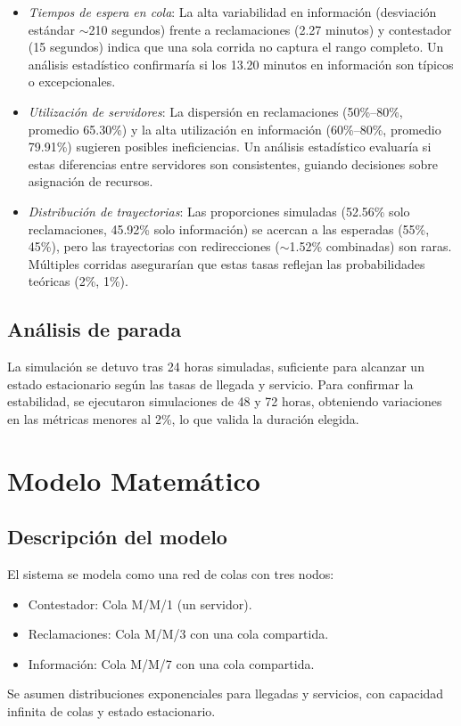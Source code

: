 \documentclass[12pt]{article}
\begin{document}
\begin{itemize}
\begin{itemize}
        \item \textit{Tiempos de espera en cola}: La alta variabilidad en información (desviación estándar $\sim$210 segundos) frente a reclamaciones (2.27 minutos) y contestador (15 segundos) indica que una sola corrida no captura el rango completo. Un análisis estadístico confirmaría si los 13.20 minutos en información son típicos o excepcionales.
        
        \item \textit{Utilización de servidores}: La dispersión en reclamaciones (50\%--80\%, promedio 65.30\%) y la alta utilización en información (60\%--80\%, promedio 79.91\%) sugieren posibles ineficiencias. Un análisis estadístico evaluaría si estas diferencias entre servidores son consistentes, guiando decisiones sobre asignación de recursos.
        
        \item \textit{Distribución de trayectorias}: Las proporciones simuladas (52.56\% solo reclamaciones, 45.92\% solo información) se acercan a las esperadas (55\%, 45\%), pero las trayectorias con redirecciones ($\sim$1.52\% combinadas) son raras. Múltiples corridas asegurarían que estas tasas reflejan las probabilidades teóricas (2\%, 1\%).
    \end{itemize}
\end{itemize}

\subsection{Análisis de parada}
La simulación se detuvo tras 24 horas simuladas, suficiente para alcanzar un estado estacionario según las tasas de llegada y servicio. Para confirmar la estabilidad, se ejecutaron simulaciones de 48 y 72 horas, obteniendo variaciones en las métricas menores al 2\%, lo que valida la duración elegida.

\section{Modelo Matemático}

\subsection{Descripción del modelo}
El sistema se modela como una red de colas con tres nodos:
\begin{itemize}
    \item Contestador: Cola M/M/1 (un servidor).
    \item Reclamaciones: Cola M/M/3 con una cola compartida.
    \item Información: Cola M/M/7 con una cola compartida.
\end{itemize}
Se asumen distribuciones exponenciales para llegadas y servicios, con capacidad infinita de colas y estado estacionario.
\end{document}
